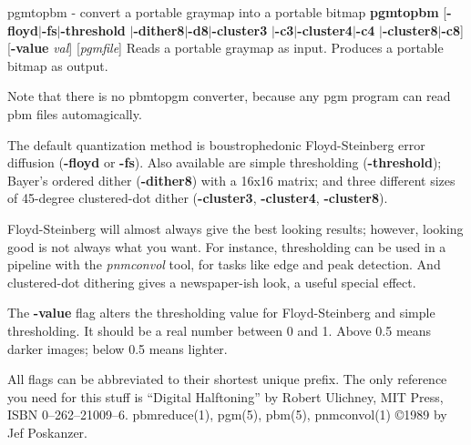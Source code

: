 \newpage
%

pgmtopbm - convert a portable graymap into a portable bitmap
{\bf pgmtopbm}
{\rm [}{\bf -floyd}{\rm $|$}{\bf -fs}{\rm $|$}{\bf -threshold}
{\rm $|$}{\bf -dither8}{\rm $|$}{\bf -d8}{\rm $|$}{\bf -cluster3}
{\rm $|$}{\bf -c3}{\rm $|$}{\bf -cluster4}{\rm $|$}{\bf -c4}
{\rm $|$}{\bf -cluster8}{\rm $|$}{\bf -c8}{\rm ]}
{\rm [}{\bf -value}
{\it val}{\rm ]}
{\rm [}{\it pgmfile}{\rm ]}
Reads a portable graymap as input.
Produces a portable bitmap as output.
\par
Note that there is no pbmtopgm converter, because any pgm program can
read pbm files automagically.
\par
The default quantization method is boustrophedonic Floyd-Steinberg error
diffusion
{\rm (}{\bf -floyd}
or
{\bf -fs}{\rm ).}
Also available are simple thresholding
{\rm (}{\bf -threshold}{\rm );}
Bayer's ordered dither
{\rm (}{\bf -dither8}{\rm )}
with a 16x16 matrix; and three different sizes of 45-degree clustered-dot dither
{\rm (}{\bf -cluster3}{\rm ,}
{\bf -cluster4}{\rm ,}
{\bf -cluster8}{\rm ).}
\par
Floyd-Steinberg will almost always give the best looking results; however,
looking good is not always what you want.
For instance, thresholding can be used in a pipeline with the
{\it pnmconvol}
tool, for tasks like edge and peak detection.
And clustered-dot dithering gives a newspaper-ish look, a useful special effect.
\par
The
{\bf -value}
flag alters the thresholding value for Floyd-Steinberg and
simple thresholding.
It should be a real number between 0 and 1.
Above 0.5 means darker images; below 0.5 means lighter.
\par
All flags can be abbreviated to their shortest unique prefix.
The only reference you need for this stuff is ``Digital Halftoning'' by
Robert Ulichney, MIT Press, ISBN 0--262--21009--6.
pbmreduce(1), pgm(5), pbm(5), pnmconvol(1)
\copyright 1989 by Jef Poskanzer.
%
 
